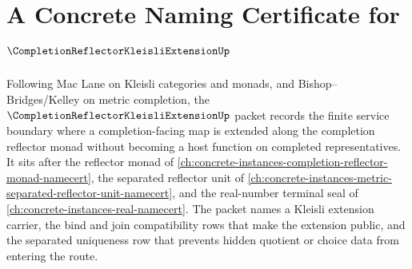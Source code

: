 \chapter{A Concrete Naming Certificate for $\CompletionReflectorKleisliExtensionUp$}
\label{ch:concrete-instances-completion-reflector-kleisli-extension-namecert}

Following Mac Lane on Kleisli categories and monads, and Bishop--Bridges/Kelley on metric completion, the $\CompletionReflectorKleisliExtensionUp$ packet records the finite service boundary where a completion-facing map is extended along the completion reflector monad without becoming a host function on completed representatives. It sits after the reflector monad of \autoref{ch:concrete-instances-completion-reflector-monad-namecert}, the separated reflector unit of \autoref{ch:concrete-instances-metric-separated-reflector-unit-namecert}, and the real-number terminal seal of \autoref{ch:concrete-instances-real-namecert}. The packet names a Kleisli extension carrier, the bind and join compatibility rows that make the extension public, and the separated uniqueness row that prevents hidden quotient or choice data from entering the route.

